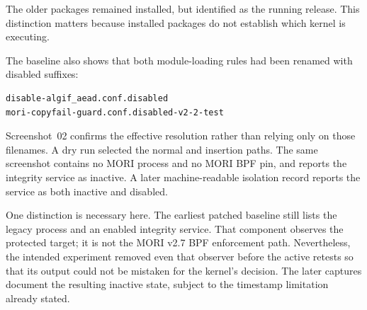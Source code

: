 The older  packages remained installed, but
 identified  as the running release. This
distinction matters because installed packages do not establish which kernel
is executing.

The baseline also shows that both module-loading rules had been renamed with
disabled suffixes:

\begin{lstlisting}
disable-algif_aead.conf.disabled
mori-copyfail-guard.conf.disabled-v2-2-test
\end{lstlisting}

Screenshot~02 confirms the effective resolution rather than relying only on
those filenames. A dry run selected the normal  and
 insertion paths. The same screenshot contains no MORI
process and no MORI BPF pin, and reports the integrity service as inactive. A
later machine-readable isolation record reports the service as both inactive
and disabled.

One distinction is necessary here. The earliest patched baseline still lists
the legacy  process and an enabled integrity
service. That component observes the protected target; it is not the MORI v2.7
BPF enforcement path. Nevertheless, the intended experiment removed even that
observer before the active retests so that its output could not be mistaken for
the kernel's decision. The later captures document the resulting inactive
state, subject to the timestamp limitation already stated.

